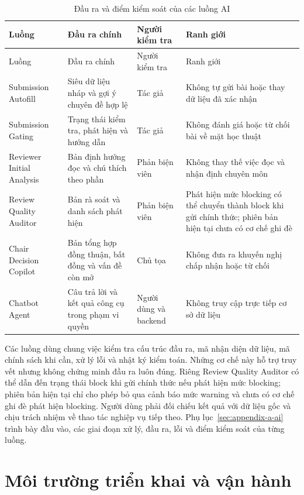 \begingroup
\setlength{\tabcolsep}{2pt}
\begin{longtable}{|T{0.18\textwidth}|T{0.25\textwidth}|T{0.22\textwidth}|T{0.25\textwidth}|}
\caption{Đầu ra và điểm kiểm soát của các luồng AI}\label{tab:ch3-demo-ai-overview}\\
\hline
Luồng & Đầu ra chính & Người kiểm tra & Ranh giới \\ \hline
\endfirsthead
\hline
Luồng & Đầu ra chính & Người kiểm tra & Ranh giới \\ \hline
\endhead
Submission Autofill & Siêu dữ liệu nháp và gợi ý chuyên đề hợp lệ & Tác giả & Không tự gửi bài hoặc thay dữ liệu đã xác nhận \\ \hline
Submission Gating & Trạng thái kiểm tra, phát hiện và hướng dẫn & Tác giả & Không đánh giá hoặc từ chối bài về mặt học thuật \\ \hline
Reviewer Initial Analysis & Bản định hướng đọc và chú thích theo phần & Phản biện viên & Không thay thế việc đọc và nhận định chuyên môn \\ \hline
Review Quality Auditor & Bản rà soát và danh sách phát hiện & Phản biện viên & Phát hiện mức blocking có thể chuyển thành block khi gửi chính thức; phiên bản hiện tại chưa có cơ chế ghi đè \\ \hline
Chair Decision Copilot & Bản tổng hợp đồng thuận, bất đồng và vấn đề còn mở & Chủ tọa & Không đưa ra khuyến nghị chấp nhận hoặc từ chối \\ \hline
Chatbot Agent & Câu trả lời và kết quả công cụ trong phạm vi quyền & Người dùng và backend & Không truy cập trực tiếp cơ sở dữ liệu \\ \hline
\end{longtable}
\endgroup

Các luồng dùng chung việc kiểm tra cấu trúc đầu ra, mã nhận diện dữ liệu, mã chính sách khi cần, xử lý lỗi và nhật ký kiểm toán. Những cơ chế này hỗ trợ truy vết nhưng không chứng minh đầu ra luôn đúng. Riêng Review Quality Auditor có thể dẫn đến trạng thái block khi gửi chính thức nếu phát hiện mức blocking; phiên bản hiện tại chỉ cho phép bỏ qua cảnh báo mức warning và chưa có cơ chế ghi đè phát hiện blocking. Người dùng phải đối chiếu kết quả với dữ liệu gốc và chịu trách nhiệm về thao tác nghiệp vụ tiếp theo. Phụ lục~\ref{sec:appendix-a-ai} trình bày đầu vào, các giai đoạn xử lý, đầu ra, lỗi và điểm kiểm soát của từng luồng.

\section{Môi trường triển khai và vận hành}
\label{sec:ch3-demo-deployment}

